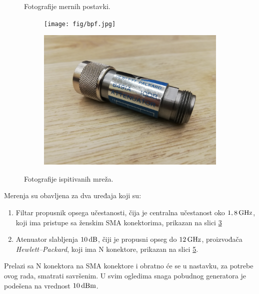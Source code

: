 \documentclass[a4paper, 12pt, diplomski]{etf}
\newcommand{\unit}[1]{\,{\rm #1}}
\begin{document}
\begin{figure}[ht!]
\begin{subfigure}[b]{0.49\textwidth}
        \label{fig:setup2}
    \end{subfigure}
    \caption{Fotografije mernih postavki.}
\end{figure}
%
\begin{figure}[ht!]
    \begin{subfigure}[b]{0.49\textwidth}
        \centering
        \texttt{[image: fig/bpf.jpg]}
        \label{fig:bpf}
    \end{subfigure}
    \hfill
    \begin{subfigure}[b]{0.49\textwidth}
        \centering
        \includegraphics[width = 1\textwidth]{fig/att.jpg}
        \label{fig:att}
    \end{subfigure}
    \caption{Fotografije ispitivanih mreža.}
\end{figure}
%
Merenja su obavljena za dva uređaja koji su:
\begin{enumerate}[(U1)]
    \item 
Filtar propusnik opsega učestanosti, 
čija je centralna učestanost
oko $1,8\unit{GHz}$, koji ima pristupe sa ženskim SMA konektorima,
prikazan na slici \ref{fig:bpf}
\item Atenuator slabljenja 
$10\unit{dB}$, čiji je propusni opseg do 
$12\unit{GHz}$, proizvođača 
\textit{Hewlett--Packard}, koji ima N konektore, prikazan
na slici \ref{fig:att}. 
\end{enumerate}
Prelazi sa  
N konektora na SMA konektore i obratno će se u nastavku,
za potrebe ovog rada, smatrati savršenim. U 
svim ogledima snaga pobudnog generatora 
je podešena na vrednost $10\unit{dBm}$.
%
\end{document}

